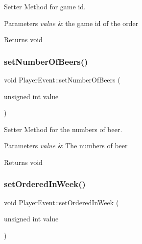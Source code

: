 Setter Method for game id. 


\begin{DoxyParams}{Parameters}
{\em value} & the game id of the order \\
\hline
\end{DoxyParams}
\begin{DoxyReturn}{Returns}
void 
\end{DoxyReturn}
\mbox{\label{classPlayerEvent_a8c210ab3387262a7ecb17b16fe049593}} 
\subsubsection{\texorpdfstring{set\+Number\+Of\+Beers()}{setNumberOfBeers()}}
{\footnotesize\ttfamily void Player\+Event\+::set\+Number\+Of\+Beers (\begin{DoxyParamCaption}\item[{unsigned int}]{value }\end{DoxyParamCaption})}



Setter Method for the numbers of beer. 


\begin{DoxyParams}{Parameters}
{\em value} & The numbers of beer \\
\hline
\end{DoxyParams}
\begin{DoxyReturn}{Returns}
void 
\end{DoxyReturn}
\mbox{\label{classPlayerEvent_ab6c0f61508410d40ff485de1c76095f1}} 
\subsubsection{\texorpdfstring{set\+Ordered\+In\+Week()}{setOrderedInWeek()}}
{\footnotesize\ttfamily void Player\+Event\+::set\+Ordered\+In\+Week (\begin{DoxyParamCaption}\item[{unsigned int}]{value }\end{DoxyParamCaption})}



